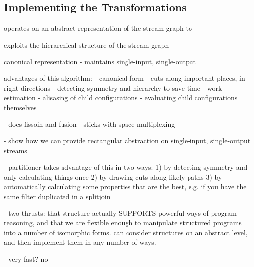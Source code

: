 \subsection{Implementing the Transformations}




operates on an abstract representation of the stream graph to

exploits
the hierarchical structure of the stream graph


canonical representation
- maintains single-input, single-output

advantages of this algorithm:
 - canonical form
  - cuts along important places, in right directions
  - detecting symmetry and hierarchy to save time
    - work estimation
    - alisasing of child configurations
    - evaluating child configurations themselves

- does fissoin and fusion
- sticks with space multiplexing

- show how we can provide rectangular abstraction on single-input, single-output streams

  - partitioner takes advantage of this in two ways: 
    1) by detecting symmetry and only calculating things once
    2) by drawing cuts along likely paths
    3) by automatically calculating some properties that are the best,
       e.g. if you have the same filter duplicated in a splitjoin

- two thrusts: that structure actually SUPPORTS powerful ways of
program reasoning, and that we are flexible enough to manipulate
structured programs into a number of isomorphic forms.  can consider
structures on an abstract level, and then implement them in any number
of ways.

- very fast?  no
